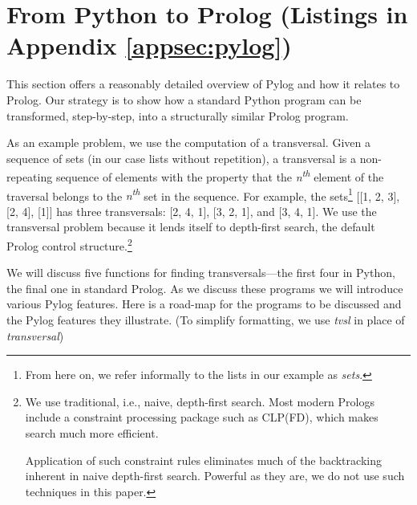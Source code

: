 \section{From Python to Prolog (Listings in Appendix \ref{appsec:pylog})} \label{sec:pylog}

This section offers a reasonably detailed overview of Pylog and how it relates to Prolog. Our strategy is to show how a standard Python program can be transformed, step-by-step, into a structurally similar Prolog program. 

As an example problem, we use the computation of a transversal. Given a sequence of sets (in our case lists without repetition), a transversal is a non-repeating sequence of elements with the property that the \textit{n\textsuperscript{th}} element of the traversal belongs to the \textit{n\textsuperscript{th}} set in the sequence.  For example, the sets\footnote{From here on, we refer informally to the lists in our example as \textit{sets}.} [[1, 2, 3], [2, 4], [1]] has three transversals: [2, 4, 1], [3, 2, 1], and [3, 4, 1]. We use the transversal problem because it lends itself to depth-first search, the default Prolog control structure.\footnote{We use traditional, i.e., naive, depth-first search. Most modern Prologs include a constraint processing package such as CLP(FD)\cite{Triska2016}, which makes search much more efficient.



Application of such constraint rules eliminates much of the backtracking inherent in naive depth-first search. Powerful as they are, we do not use such techniques in this paper.}

We will discuss five functions for finding transversals---the first four in Python, the final one in standard Prolog. As we discuss these programs we will introduce various Pylog features. Here is a road-map for the programs to be discussed and the Pylog features they illustrate. (To simplify formatting, we use \textit{tvsl} in place of \textit{transversal})

